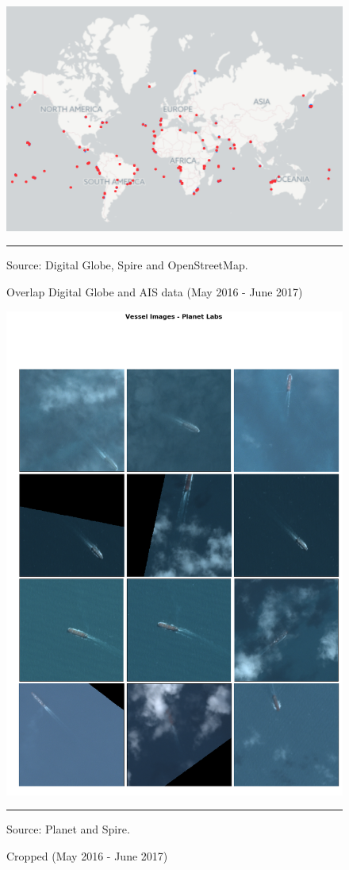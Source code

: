 \begin{figure}[h]
	\centering \caption{Overlap Digital Globe and AIS data (May 2016 - June 2017)}\label{overlap}
\includegraphics[width=0.6\linewidth]{images/overlap_gbdx.png} 
\begin{flushleft}
\rule{1.2in}{0em} \scriptsize Source: Digital Globe, Spire and OpenStreetMap. \\
\par
\end{flushleft}
\end{figure}

\begin{figure}[h]
	\centering \caption{Cropped  (May 2016 - June 2017)}\label{overlap}
\includegraphics[width=0.6\linewidth]{images/mosaic_planet_torres_strait.png} 
\begin{flushleft}
\rule{1.2in}{0em} \scriptsize Source: Planet and Spire. \\
\par
\end{flushleft}
\end{figure}


